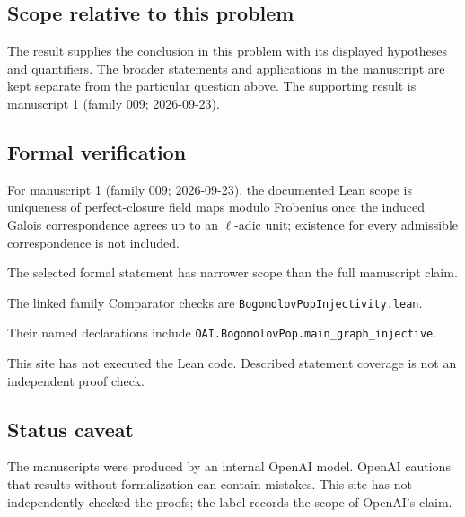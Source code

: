 \documentclass[11pt]{article}
\begin{document}
\subsection{Scope relative to this problem}
The result supplies the conclusion in this problem with its displayed hypotheses and quantifiers. The broader statements and applications in the manuscript are kept separate from the particular question above. The supporting result is manuscript 1 (family 009; 2026-09-23).

\subsection{Formal verification}
For manuscript 1 (family 009; 2026-09-23), the documented Lean scope is uniqueness of perfect-closure field maps modulo Frobenius once the induced Galois correspondence agrees up to an $\ell$-adic unit; existence for every admissible correspondence is not included.

The selected formal statement has narrower scope than the full manuscript claim.

The linked family Comparator checks are \texttt{BogomolovPopInjectivity.lean}.

Their named declarations include \texttt{OAI.BogomolovPop.main\_graph\_injective}.

This site has not executed the Lean code. Described statement coverage is not an independent proof check.

\subsection{Status caveat}
The manuscripts were produced by an internal OpenAI model. OpenAI cautions that results without formalization can contain mistakes. This site has not independently checked the proofs; the label records the scope of OpenAI's claim.
\end{document}
